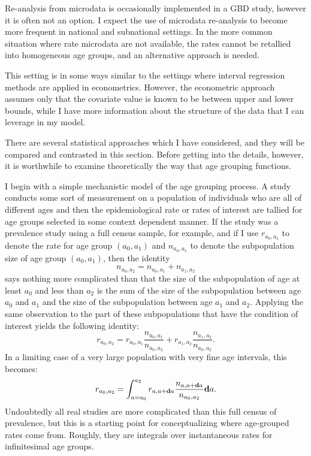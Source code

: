 Re-analysis from microdata is occasionally implemented in a GBD study,
however it is often not an option.  I expect the use of microdata
re-analysis to become more frequent in national and subnational
settings.  In the more common situation where rate microdata are not
available, the rates cannot be retallied into homogeneous age groups,
and an alternative approach is needed.

This setting is in some ways similar to the settings where interval
regression methods are applied in
econometrics.\cite{amemiya_regression_1973,manski_inference_2002,cook_partially_2012}
However, the econometric approach assumes only that the covariate
value is known to be between upper and lower bounds, while I have more
information about the structure of the data that I can leverage in my
model.

There are several statistical approaches which I have considered, and
they will be compared and contrasted in this section.  Before getting
into the details, however, it is worthwhile to examine theoretically
the way that age grouping functions.

I begin with a simple mechanistic model of the age grouping process.
A study conducts some sort of measurement on a population of
individuals who are all of different ages and then the
epidemiological rate or rates of interest are tallied for age groups
selected in some context dependent manner. If the study was a
prevalence study using a full census sample, for example, and if I use
$r_{a_0,a_1}$ to denote the rate for age group $(a_0, a_1)$ and
$n_{a_0,a_1}$ to denote the subpopulation size of age group
$(a_0,a_1)$, then the identity
\[
n_{a_0, a_2} = n_{a_0,a_1} + n_{a_1,a_2}
\]
says nothing more complicated than that the size of the subpopulation
of age at least $a_0$ and less than $a_2$ is the sum of the size of
the subpopulation between age $a_0$ and $a_1$ and the size of the
subpopulation between age $a_1$ and $a_2$.  Applying the same
observation to the part of these subpopulations that have the condition
of interest yields the following identity:
\[
r_{a_0,a_2} = r_{a_0,a_1}\frac{n_{a_0,a_1}}{n_{a_0,a_2}} + r_{a_1,a_2}\frac{n_{a_1,a_2}}{n_{a_0,a_2}}. 
\] 
In a limiting case of a very large population with very fine age
intervals, this becomes:
\[
r_{a_0,a_2} = \int_{a=a_0}^{a_2} r_{a,a+\mathbf{d} a}\frac{n_{a,a+\mathbf{d} a}}{n_{a_0,a_2}}\mathbf{d} a.
\]
Undoubtedly all real studies are more complicated than this full
census of prevalence, but this is a starting point for conceptualizing
where age-grouped rates come from.  Roughly, they are integrals over
instantaneous rates for infinitesimal age groups.

